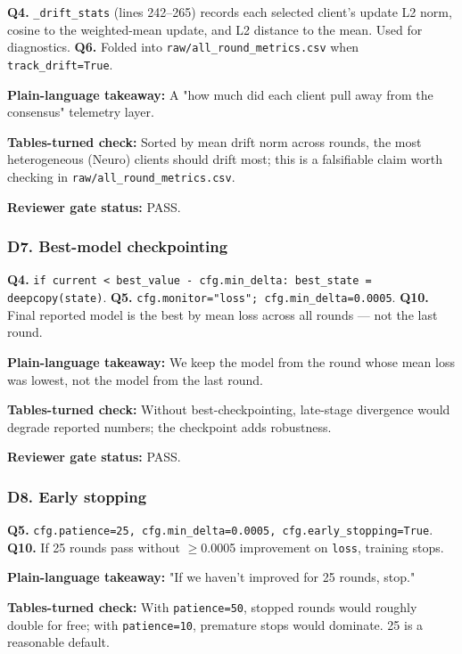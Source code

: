 \documentclass{article}
\begin{document}
\textbf{Q4.} \texttt{\_drift\_stats} (lines 242--265) records each selected client's update L2 norm, cosine to the weighted-mean update, and L2 distance to the mean. Used for diagnostics. \textbf{Q6.} Folded into \texttt{raw/all\_round\_metrics.csv} when \texttt{track\_drift=True}.


\textbf{Plain-language takeaway:} A "how much did each client pull away from the consensus" telemetry layer.


\textbf{Tables-turned check:} Sorted by mean drift norm across rounds, the most heterogeneous (Neuro) clients should drift most; this is a falsifiable claim worth checking in \texttt{raw/all\_round\_metrics.csv}.


\textbf{Reviewer gate status:} PASS.


\subsubsection{D7. Best-model checkpointing}


\textbf{Q4.} \texttt{if current < best\_value - cfg.min\_delta: best\_state = deepcopy(state)}. \textbf{Q5.} \texttt{cfg.monitor="loss"; cfg.min\_delta=0.0005}. \textbf{Q10.} Final reported model is the best by mean loss across all rounds --- not the last round.


\textbf{Plain-language takeaway:} We keep the model from the round whose mean loss was lowest, not the model from the last round.


\textbf{Tables-turned check:} Without best-checkpointing, late-stage divergence would degrade reported numbers; the checkpoint adds robustness.


\textbf{Reviewer gate status:} PASS.


\subsubsection{D8. Early stopping}


\textbf{Q5.} \texttt{cfg.patience=25, cfg.min\_delta=0.0005, cfg.early\_stopping=True}. \textbf{Q10.} If 25 rounds pass without \ensuremath{\geq}0.0005 improvement on \texttt{loss}, training stops.


\textbf{Plain-language takeaway:} "If we haven't improved for 25 rounds, stop."


\textbf{Tables-turned check:} With \texttt{patience=50}, stopped rounds would roughly double for free; with \texttt{patience=10}, premature stops would dominate. 25 is a reasonable default.
\end{document}
